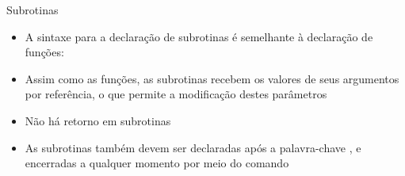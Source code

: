 \begin{frame}[fragile]{Subrotinas}

    \begin{itemize}
        \item A sintaxe para a declaração de subrotinas é semelhante à declaração de funções:


        \item Assim como as funções, as subrotinas recebem os valores de seus argumentos por
            referência, o que permite a modificação destes parâmetros

        \item Não há retorno em subrotinas

        \item As subrotinas também devem ser declaradas após a palavra-chave 
            , e encerradas a qualquer momento por meio do comando

    \end{itemize}

\end{frame}

